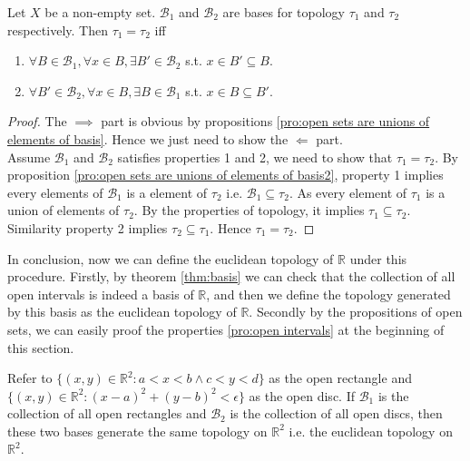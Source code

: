 \begin{theorem}{}{}
    Let $X$ be a non-empty set. $\mathcal{B}_{1}$ and
    $\mathcal{B}_{2}$ are bases for topology $\tau_{1}$ and
    $\tau_{2}$ respectively. Then $\tau_{1} = \tau_{2}$ iff
    \begin{enumerate}

        \item $\forall B \in \mathcal{B}_{1}, \forall x \in B,
            \exists B' \in \mathcal{B}_{2}$ s.t. $x \in B' \subseteq B$.
        \item $\forall  B'\in \mathcal{B}_{2}, \forall x \in B,
            \exists B \in \mathcal{B}_{1}$ s.t. $x \in B \subseteq B'$.

    \end{enumerate}
\end{theorem}

\begin{proof}
    The $\implies$ part is obvious by propositions \ref{pro:open sets
    are unions of elements of basis}. Hence we just need to show the
    $\Leftarrow $ part.\\
    Assume $\mathcal{B}_{1}$ and $\mathcal{B}_{2}$ satisfies
    properties 1 and 2, we need to show that $\tau_{1} = \tau_{2}$.
    By proposition \ref{pro:open sets are unions of elements of
    basis2}, property 1 implies every elements of $\mathcal{B}_{1}$
    is a element of
    $\tau_{2}$ i.e. $\mathcal{B}_{1} \subseteq \tau_{2}$. As every
    element of $\tau_{1}$ is a union of elements of
    $\tau_{2}$. By the properties of topology, it implies
    $\tau_{1}\subseteq \tau_{2}$. \\
    Similarity property 2 implies
    $\tau_{2} \subseteq \tau_{1}$. Hence $\tau_{1} = \tau_{2}$.
\end{proof}

\begin{remarks}
    In conclusion, now we can define the euclidean topology of
    $\mathbb{R}$ under this procedure. Firstly, by theorem
    \ref{thm:basis} we can check that the collection
    of all open intervals is indeed a basis of $\mathbb{R}$, and then we
    define the topology generated by this basis as the euclidean
    topology of $\mathbb{R}$. Secondly by the propositions of open sets,
    we can easily proof the properties \ref{pro:open intervals} at the
    beginning of this section.
\end{remarks}

\begin{example}
    Refer to $\{(x,y) \in \mathbb{R}^{2}: a<x<b \land
    c<y<d\}$ as the open rectangle and $\{(x,y) \in \mathbb{R}^{2}:
    (x-a)^2 + (y-b)^2 < \epsilon\}$ as the open disc. If
    $\mathcal{B}_{1}$ is the collection of all open rectangles and
    $\mathcal{B}_{2}$ is the collection of all open discs, then these
    two bases generate the same topology on $\mathbb{R}^2$ i.e. the
    euclidean topology on $\mathbb{R}^2$.
\end{example}

